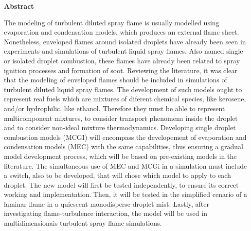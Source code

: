 \vspace{1cm}

{ \Large \textbf{Abstract}}

\vspace{0.8cm}

{

\noindent %
The modeling of turbulent diluted spray flame is usually modelled using evaporation and condensation models, which produces an external flame sheet.
Nonetheless, enveloped flames around isolated droplets have already been seen in experiments and simulations of turbulent liquid spray flames.
Also named single or isolated droplet combustion, these flames have already been related to spray ignition processes and formation of soot.
Reviewing the literature, it was clear that the modeling of enveloped flames should be included in simulations of turbulent diluted liquid spray flames. 
The development of such models ought to represent real fuels which are mixtures of diferent chemical species, like kerosene, and/or hydrophilic, like ethanol.  
Therefore they must be able to represent multicomponent mixtures, to consider transport phenomena inside the droplet and to consider non-ideal mixture thermodynamics.
Developing single droplet combustion models (MCGI) will encompass the developement of evaporation and condensation models (MEC) with the same capabilities, thus ensuring a gradual model development process, which will be based on pre-existing models in the literature.
The simultaneous use of MEC and MCGi in a simulation must include a switch, also to be developed, that will chose which model to apply to each droplet.
The new model will first be tested independently, to ensure its correct working and implementation.
Then, it will be tested in the simplified cenario of a laminar flame in a quiescent monodisperse droplet mist.
Lastly, after investigating flame-turbulence interaction, the model will be used in multidimensionais turbulent spray flame simulations.

}